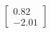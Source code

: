 \documentclass[preview]{standalone}
\begin{document}
\begin{align*}
\begin{bmatrix} 0.82 \\ -2.01 \end{bmatrix}
\end{align*}
\end{document}
